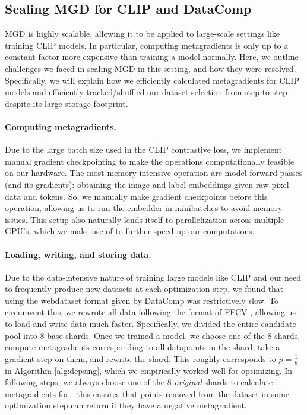 \subsection{Scaling MGD for CLIP and DataComp}
\label{sec:scaling_clip}

MGD is highly scalable, allowing it to be applied to large-scale settings like
training CLIP models.  In particular, computing metagradients is only up to a
constant factor more expensive than training a model normally. 
Here, we outline challenges we faced in scaling MGD in this setting, and how they were resolved.
Specifically, we will explain how we efficiently calculated metagradients for
CLIP models and efficiently tracked/shuffled our dataset selection from
step-to-step despite its large storage footprint.

\paragraph{Computing metagradients.}
Due to the large batch size used in the CLIP contrastive loss, we implement
manual gradient checkpointing to make the operations computationally feasible
on our hardware.  The most memory-intensive operation are model forward passes
(and its gradients): obtaining the image and label embeddings given raw pixel
data and tokens.  So, we manually make gradient checkpoints before this
operation, allowing us to run the embedder in minibatches to avoid memory
issues.  This setup also naturally lends itself to parallelization across
multiple GPU's, which we make use of to further speed up our computations.

\paragraph{Loading, writing, and storing data.}
Due to the data-intensive nature of training large models like CLIP and our
need to frequently produce new datasets at each optimization step, we found
that using the webdataset \cite{webdataset2024webdataset} format given by
DataComp was restrictively slow.  To circumvent this, we rewrote all data
following the format of FFCV \cite{leclerc2022ffcv}, allowing us to load and
write data much faster.  Specifically, we divided the entire candidate pool
into 8 base shards.  Once we trained a model, we choose one of the 8 shards,
compute metagradients corresponding to all datapoints in the shard, take a
gradient step on them, and rewrite the shard.  This roughly corresponds to $p =
\frac{1}{8}$ in Algorithm \ref{alg:depsing}, which we empirically worked well
for optimizing.  In following steps, we always choose one of the 8
\emph{original} shards to calculate metagradients for---this ensures that
points removed from the dataset in some optimization step can return if they
have a negative metagradient.

